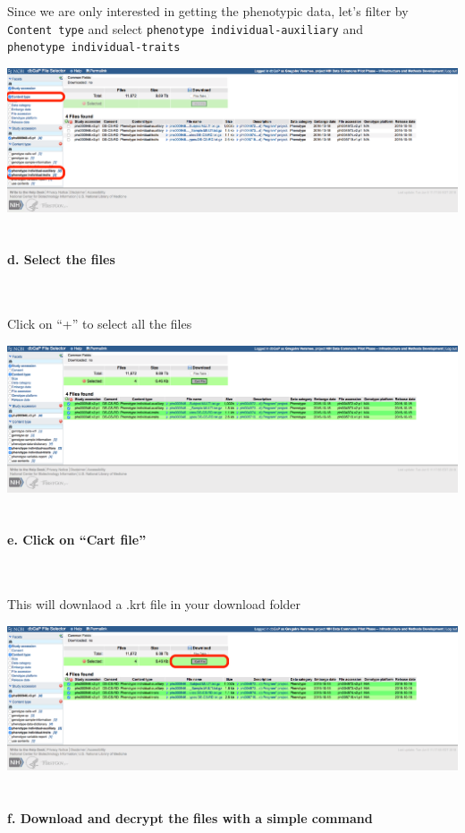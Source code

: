 \documentclass[11pt]{article}
\makeatletter
\def\maxwidth{\ifdim\Gin@nat@width>\linewidth\linewidth
    \else\Gin@nat@width\fi}
\let\Oldincludegraphics\includegraphics
\renewcommand{\includegraphics}[1]{\Oldincludegraphics[width=.8\maxwidth]{#1}}
\makeatother
\begin{document}
Since we are only interested in getting the phenotypic
data, let's filter by \texttt{Content\ type} and select
\texttt{phenotype\ individual-auxiliary} and
\texttt{phenotype\ individual-traits}
\ 

\includegraphics{Screenshots/Screen61.png}
\ 

\hypertarget{d.-select-the-files}{%
\paragraph{d. Select the files}\label{d.-select-the-files}}
\ 

Click on ``+'' to select all the files
\ 

\includegraphics{Screenshots/Screen72.png}
\ 
\hypertarget{e.-click-on-cart-file}{%
\paragraph{e. Click on ``Cart file''}\label{e.-click-on-cart-file}}
\ 

This will downlaod a .krt file in your download folder
\ 

\includegraphics{Screenshots/Screen81.png}
\ 

\hypertarget{f.-download-and-decrypt-the-files-with-a-simple-command}{%
\paragraph{f. Download and decrypt the files with a simple command}\label{f.-download-and-decrypt-the-files-with-a-simple-command}}
\end{document}

